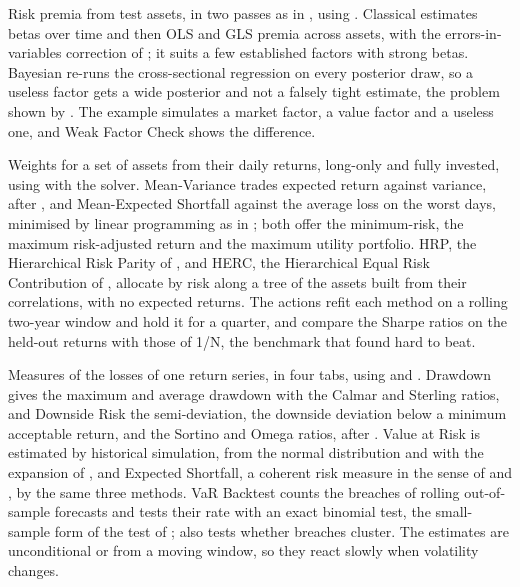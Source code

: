 Risk premia from test assets, in two passes as in , using . Classical estimates betas over time and then OLS and GLS premia across assets, with the errors-in-variables correction of ; it suits a few established factors with strong betas. Bayesian re-runs the cross-sectional regression on every posterior draw, so a useless factor gets a wide posterior and not a falsely tight estimate, the problem shown by . The example simulates a market factor, a value factor and a useless one, and Weak Factor Check shows the difference.

Weights for a set of assets from their daily returns, long-only and fully invested, using  with the  solver. Mean-Variance trades expected return against variance, after , and Mean-Expected Shortfall against the average loss on the worst days, minimised by linear programming as in ; both offer the minimum-risk, the maximum risk-adjusted return and the maximum utility portfolio. HRP, the Hierarchical Risk Parity of , and HERC, the Hierarchical Equal Risk Contribution of , allocate by risk along a tree of the assets built from their correlations, with no expected returns. The actions refit each method on a rolling two-year window and hold it for a quarter, and compare the Sharpe ratios on the held-out returns with those of 1/N, the benchmark that  found hard to beat.

Measures of the losses of one return series, in four tabs, using  and . Drawdown gives the maximum and average drawdown with the Calmar and Sterling ratios, and Downside Risk the semi-deviation, the downside deviation below a minimum acceptable return, and the Sortino and Omega ratios, after . Value at Risk is estimated by historical simulation, from the normal distribution and with the expansion of , and Expected Shortfall, a coherent risk measure in the sense of  and , by the same three methods. VaR Backtest counts the breaches of rolling out-of-sample forecasts and tests their rate with an exact binomial test, the small-sample form of the test of ;  also tests whether breaches cluster. The estimates are unconditional or from a moving window, so they react slowly when volatility changes.

